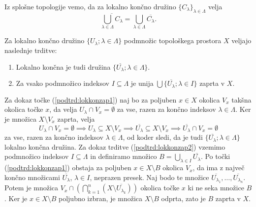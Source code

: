 \documentclass[mat1]{fmfdelo}
\newcommand{\closure}[1]{\overline{#1}}
\begin{document}
\begin{opomba}\label{opo:lokkon} %
Iz splošne topologije vemo, da za lokalno končno družino $\lbrace C_\lambda \rbrace_{\lambda \in \Lambda}$ velja
\[ \closure{\bigcup_{\lambda \in \Lambda} C_\lambda} = \bigcup_{\lambda \in \Lambda} \closure{C_\lambda}. \]
\end{opomba}

\begin{trditev}\label{trd:lokkonzap}
Za lokalno končno družino $\lbrace U_\lambda ; \lambda \in \Lambda \rbrace$ podmnožic topološkega prostora $X$ veljajo naslednje trditve:
\begin{enumerate} 
\item Lokalno končna je tudi družina $\lbrace \closure{U_\lambda} ; \lambda \in \Lambda \rbrace$.\label{podtrd:lokkonzap1}
\item Za vsako podmnožico indeksov $I \subseteq \Lambda$ je unija $\bigcup\lbrace \closure{U_\lambda} ; \lambda \in I \rbrace$ zaprta v $X$.\label{podtrd:lokkonzap2}
\end{enumerate}
\end{trditev}

\begin{dokaz}
Za dokaz točke (\ref{podtrd:lokkonzap1}) naj bo za poljuben $x \in X$ okolica $V_x$ takšna okolica točke $x$, da velja $U_\lambda \cap V_x = \emptyset$ za vse, razen za končno indeksov $\lambda \in \Lambda$. Ker je množica $X \setminus V_x$ zaprta, velja
\[ U_\lambda \cap V_x = \emptyset \implies U_\lambda \subseteq X \setminus V_x \implies \closure{U_\lambda} \subseteq X \setminus V_x \implies \closure{U_\lambda} \cap V_x = \emptyset \]
za vse, razen za končno indeksov $\lambda \in \Lambda$, od koder sledi, da je tudi $\lbrace \closure{U_\lambda} ; \lambda \in \Lambda \rbrace$ lokalno končna družina.
Za dokaz trditve (\ref{podtrd:lokkonzap2}) vzemimo podmnožico indeksov $I \subseteq \Lambda$ in definiramo množico $B = \bigcup_{\lambda \in I}\closure{U_\lambda}$. Po točki (\ref{podtrd:lokkonzap1}) obstaja za poljuben $x \in X \setminus B$ okolica $V_x$, da ima z največ končno množicami $\closure{U_\lambda}$, $\lambda \in I$, neprazen presek. Naj bodo te množice $\closure{U_{\lambda_1}},\dots,\closure{U_{\lambda_n}}$. Potem je množica $V_x \cap (\bigcap_{k=1}^n(X \setminus \closure{U_{\lambda_k}}))$ okolica točke $x$ ki ne seka množice $B$. Ker je $x \in X \setminus B$ poljubno izbran, je množica $X \setminus B$ odprta, zato je $B$ zaprta v $X$.
\end{dokaz}
\end{document}

